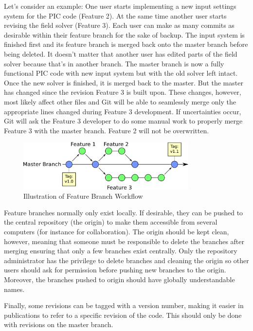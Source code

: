 \documentclass[10pt,a4paper]{article}
\begin{document}
Let's consider an example: One user starts implementing a new input settings system for the PIC code (Feature 2). At the same time another user starts revising the field solver (Feature 3). Each user can make as many commits as desirable within their feature branch for the sake of backup. The input system is finished first and its feature branch is merged back onto the master branch before being deleted. It doesn't matter that another user has edited parts of the field solver because that's in another branch. The master branch is now a fully functional PIC code with new input system but with the old solver left intact. Once the new solver is finished, it is merged back to the master. But the master has changed since the revision Feature 3 is built upon. These changes, however, most likely affect other files and Git will be able to seamlessly merge only the appropriate lines changed during Feature 3 development. If uncertainties occur, Git will ask the Feature 3 developer to do some manual work to properly merge Feature 3 with the master branch. Feature 2 will not be overwritten.

\begin{figure}
	\centering
	\includegraphics[width=0.8\textwidth]{featurebranch.png}
	\caption{Illustration of Feature Branch Workflow}
	\label{fig:featurebranch}
\end{figure}

Feature branches normally only exist locally. If desirable, they can be pushed to the central repository (the origin) to make them accessible from several computers (for instance for collaboration). The origin should be kept clean, however, meaning that someone must be responsible to delete the branches after merging ensuring that only a few branches exist centrally. Only the repository administrator has the privilege to delete branches and cleaning the origin so other users should ask for permission before pushing new branches to the origin. Moreover, the branches pushed to origin should have globally understandable names.

Finally, some revisions can be tagged with a version number, making it easier in publications to refer to a specific revision of the code. This should only be done with revisions on the master branch.
\end{document}
